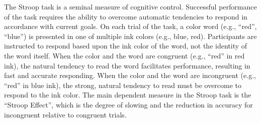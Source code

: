 \documentclass[titlepage,12pt] {article}
\begin{document}
The Stroop task is a seminal measure of cognitive control. Successful performance of the task requires the ability to overcome automatic tendencies to respond in accordance with current goals. On each trial of the task, a color word (e.g., ``red'', ``blue'') is presented in one of multiple ink colors (e.g., blue, red). Participants are instructed to respond based upon the ink color of the word, not the identity of the word itself. When the color and the word are congruent (e.g., “red” in red ink), the natural tendency to read the word facilitates performance, resulting in fast and accurate responding. When the color and the word are incongruent (e.g., ``red'' in blue ink), the strong, natural tendency to read must be overcome to respond to the ink color. The main dependent measure in the Stroop task is the ``Stroop Effect'', which is the degree of slowing and the reduction in accuracy for incongruent relative to congruent trials.
\end{document}
